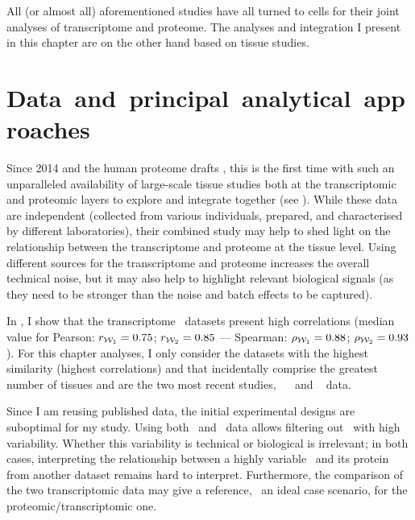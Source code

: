 All (or almost all) aforementioned studies have all turned to cells
for their joint analyses of transcriptome and proteome.
The analyses and integration I present in this chapter are
on the other hand based on tissue studies.

\vspace{-2mm}
\section{Data~and~principal~analytical~approaches}\label{sec:IntegrationData}
\vspace{-4mm}
Since 2014 and the human proteome drafts ,
this is the first time with such
an unparalleled availability of large-scale tissue studies
both at the transcriptomic and proteomic layers to explore and integrate together
(see ).
While these data are independent
(collected from various individuals, prepared,
and characterised by different laboratories),
their combined study may help
to shed light on the relationship
between the transcriptome and proteome at the tissue level.
Using different sources for the transcriptome and proteome
increases the overall technical noise,
but it may also help to highlight relevant biological signals (as
they need to be stronger than the noise and batch effects to be captured).

In , I show that
the transcriptome \Rnaseq\ datasets present high correlations
(median value for Pearson: $r_{\mathcal{W}_1}=0.75$; $r_{\mathcal{W}_2}=0.85$ ---
Spearman: $\rho_{\mathcal{W}_1}=0.88$; $\rho_{\mathcal{W}_2}=0.93$).
For this chapter analyses,
I only consider the datasets with the highest similarity
(highest correlations) and
that incidentally comprise the greatest number of tissues
and are the two most recent studies,
\ie\ ~
and ~ data.\\
\vspace{-\baselineskip}

Since I am reusing published data,
the initial experimental designs are suboptimal for my study.
Using both \uhlen\ and \gtex\ data
allows filtering out \mRNAs\ with high variability.
Whether this variability is technical or biological is irrelevant;
in both cases,
interpreting the relationship
between a highly variable \mRNAs\ and its protein from another dataset
remains hard to interpret.
Furthermore, the comparison of the two transcriptomic data may give a reference,
\ie\ an ideal case scenario, for the proteomic/transcriptomic one.

